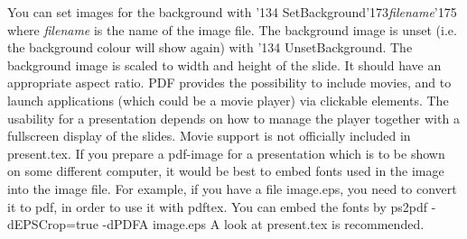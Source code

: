 \endFrames
\NewSlide
\NoTrans
You can set images for the background with 
\vskip5pt
{\cf\char'134 SetBackground\char'173}{\it filename}{\cf\char'175}
\vskip5pt
where
{\it filename} is the name of the image file.
\vskip5pt
The background image is unset (i.e. the background colour  will show again) with {\cf\char'134 UnsetBackground}.
\vskip5pt
The background image is scaled to width and height of the slide. It should have an appropriate aspect ratio.
\vskip5pt
\NewSlide
\UnsetBackground
PDF provides the possibility to include movies, and to launch applications (which could be a movie player) via clickable
elements. The usability for a presentation depends on how to manage the player together with a fullscreen display of the
slides. Movie support is not officially included in {\cf present.tex}.
\vskip5pt
If you prepare a pdf-image for a presentation which is to be shown on some different computer, it would be best to
embed fonts used in the image into the image file. For example, if you have a file {\cf image.eps}, you need to
convert it to pdf, in order to use it with {\cf pdftex}. You can embed the fonts by
\vskip5pt
{\cf  ps2pdf -dEPSCrop=true -dPDFA image.eps} 
\vskip5pt
A look at {\cf present.tex} is recommended.
\bye
